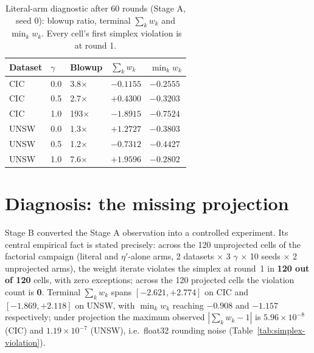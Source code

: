 \documentclass[11pt,a4paper]{report}
\begin{document}
\begin{table}[htbp]
  \centering
  \caption{Literal-arm diagnostic after 60 rounds (Stage A, seed 0):
  blowup ratio, terminal $\sum_k w_k$ and $\min_k w_k$. Every cell's first
  simplex violation is at round 1.}
  \label{tab:literal-diagnostic}
  \footnotesize
  \begin{tabular}{@{}lllll@{}}
    \toprule
    Dataset & $\gamma$ & Blowup & $\sum_k w_k$ & $\min_k w_k$ \\
    \midrule
    CIC & 0.0 & 3.8$\times$  & $-0.1155$ & $-0.2555$ \\
    CIC & 0.5 & 2.7$\times$  & $+0.4300$ & $-0.3203$ \\
    CIC & 1.0 & 193$\times$  & $-1.8915$ & $-0.7524$ \\
    UNSW & 0.0 & 1.3$\times$ & $+1.2727$ & $-0.3803$ \\
    UNSW & 0.5 & 1.2$\times$ & $-0.7312$ & $-0.4427$ \\
    UNSW & 1.0 & 7.6$\times$ & $+1.9596$ & $-0.2802$ \\
    \bottomrule
  \end{tabular}
\end{table}

\section{Diagnosis: the missing projection}
\label{sec:diagnosis}

Stage B converted the Stage A observation into a controlled experiment. Its
central empirical fact is stated precisely: across the 120 unprojected cells
of the factorial campaign (literal and $\eta'$-alone arms, 2 datasets
$\times$ 3 $\gamma$ $\times$ 10 seeds $\times$ 2 unprojected arms), the
weight iterate violates the simplex at round~1 in \textbf{120 out of 120}
cells, with zero exceptions; across the 120 projected cells the violation
count is \textbf{0}. Terminal $\sum_k w_k$ spans $[-2.621, +2.774]$ on CIC
and $[-1.869, +2.118]$ on UNSW, with $\min_k w_k$ reaching $-0.908$ and
$-1.157$ respectively; under projection the maximum observed
$|\sum_k w_k - 1|$ is $5.96 \times 10^{-8}$ (CIC) and $1.19 \times 10^{-7}$
(UNSW), i.e.\ float32 rounding noise (Table~\ref{tab:simplex-violation}).
\end{document}
